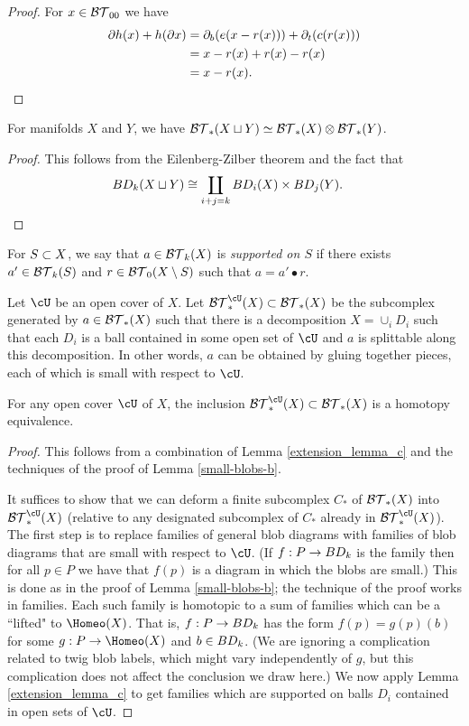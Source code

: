 \begin{proof}
For $x\in {\mathcal{BT}}_{00}$ we have
\begin{align*}
	\partial h(x) + h(\partial x) &= \partial_b(e(x - r(x))) + \partial_t(c(r(x))) \\
			&= x - r(x) + r(x) - r(x)\\
			&= x - r(x). \qedhere
\end{align*}
\end{proof}

\begin{lemma} \label{btc-prod}
For manifolds $X$ and $Y$, we have ${\mathcal{BT}}_*(X\sqcup Y) \simeq {\mathcal{BT}}_*(X)\otimes{\mathcal{BT}}_*(Y)$.
\end{lemma}
\begin{proof}
This follows from the Eilenberg-Zilber theorem and the fact that
\begin{align*}
	BD_k(X\sqcup Y) & \cong \coprod_{i+j=k} BD_i(X)\times BD_j(Y) . \qedhere
\end{align*}
\end{proof}

For $S\subset X$, we say that $a\in {\mathcal{BT}}_k(X)$ is {\it supported on $S$}
if there exists $a'\in {\mathcal{BT}}_k(S)$
and $r\in {\mathcal{BT}}_0(X\setminus S)$ such that $a = a'\bullet r$.

\newcommand\sbtc{\btc^{\cU}}
Let $\cU$ be an open cover of $X$.
Let $\sbtc_*(X)\sub\btc_*(X)$ be the subcomplex generated by
$a\in {\mathcal{BT}}_*(X)$ such that there is a decomposition $X = \cup_i D_i$
such that each $D_i$ is a ball contained in some open set of $\cU$ and
$a$ is splittable along this decomposition.
In other words, $a$ can be obtained by gluing together pieces, each of which
is small with respect to $\cU$.

\begin{lemma} \label{small-top-blobs}
For any open cover $\cU$ of $X$, the inclusion $\sbtc_*(X)\sub\btc_*(X)$
is a homotopy equivalence.
\end{lemma}
\begin{proof}
This follows from a combination of Lemma \ref{extension_lemma_c} and the techniques of
the proof of Lemma \ref{small-blobs-b}.

It suffices to show that we can deform a finite subcomplex $C_*$ of ${\mathcal{BT}}_*(X)$ into $\sbtc_*(X)$
(relative to any designated subcomplex of $C_*$ already in $\sbtc_*(X)$).
The first step is to replace families of general blob diagrams with families 
of blob diagrams that are small with respect to $\cU$.
(If $f:P \to BD_k$ is the family then for all $p\in P$ we have that $f(p)$ is a diagram in which the blobs are small.)
This is done as in the proof of Lemma \ref{small-blobs-b}; the technique of the proof works in families.
Each such family is homotopic to a sum of families which can be a ``lifted" to $\Homeo(X)$.
That is, $f:P \to BD_k$ has the form $f(p) = g(p)(b)$ for some $g:P\to \Homeo(X)$ and $b\in BD_k$.
(We are ignoring a complication related to twig blob labels, which might vary
independently of $g$, but this complication does not affect the conclusion we draw here.)
We now apply Lemma \ref{extension_lemma_c} to get families which are supported 
on balls $D_i$ contained in open sets of $\cU$.
\end{proof}


